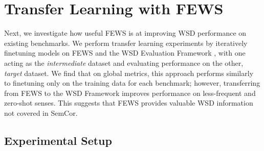 \documentclass[11pt,a4paper]{article}
\begin{document}
\begin{table}[t]
\centering
    \caption{F1-score on the MFS, LFS, and zero-shot subsets of the \textbf{ALL} evaluation set from the WSD Evaluation Framework. Zero-shot examples are the words and senses (respectively) from the evaluation suite that do not occur in SemCor.}
    \label{semcor-lfs-table}
\end{table}

\section{Transfer Learning with FEWS}
\label{transfer-section}

Next, we investigate how useful FEWS is at improving WSD performance on existing benchmarks. We perform transfer learning experiments by iteratively finetuning models on FEWS and the WSD Evaluation Framework \cite{raganato2017word}, with one acting as the \textit{intermediate} dataset and evaluating performance on the other, \textit{target} dataset. We find that on global metrics, this approach performs similarly to finetuning only on the training data for each benchmark; however, transferring from FEWS to the WSD Framework improves performance on less-frequent and zero-shot senses. This suggests that FEWS provides valuable WSD information not covered in SemCor.

\subsection{Experimental Setup}
\end{document}

